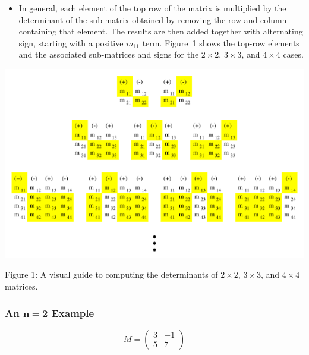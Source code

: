 \documentclass[12pt]{article}
\begin{document}
\begin{itemize}
\item In general, each element of the top row of the matrix is
  multiplied by the determinant of the sub-matrix obtained by removing
  the row and column containing that element. The results are
  then added together with alternating sign, starting with a positive
  $m_{11}$ term. Figure~1 %
  shows the top-row elements and the associated sub-matrices and signs
  for the $2 \times 2$, $3 \times 3$, and $4 \times 4$ cases.

\end{itemize}

\begin{center}
\includegraphics{dets.png}

Figure 1: A visual guide to computing the determinants of $2 \times 2$,
$3 \times 3$, and $4 \times 4$ matrices.

\end{center}

\subsubsection*{An $\mathbf{n=2}$ Example}

\begin{equation}
M =  
\left(
\begin{array}{cccc}
3  & -1 \\
5  &  7 
\end{array}
\right)
\end{equation}
\end{document}
